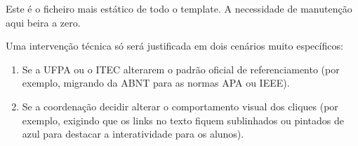 Este é o ficheiro mais estático de todo o template. A necessidade de manutenção aqui beira a zero.

Uma intervenção técnica só será justificada em dois cenários muito específicos:
\begin{enumerate}
    \item Se a UFPA ou o ITEC alterarem o padrão oficial de referenciamento (por exemplo, migrando da ABNT para as normas APA ou IEEE).

    \item Se a coordenação decidir alterar o comportamento visual dos cliques (por exemplo, exigindo que os links no texto fiquem sublinhados ou pintados de azul para destacar a interatividade para os alunos).
\end{enumerate}